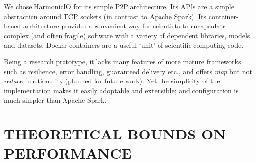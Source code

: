 \documentclass[letterpaper,conference]{IEEEtran}
\begin{document}
We chose HarmonicIO for its simple P2P architecture. Its APIs are a simple abstraction around TCP sockets (in contrast to Apache Spark). Its container-based architecture provides a convenient way for scientists to encapsulate complex (and often fragile) software with a variety of dependent libraries, models and datasets. Docker containers are a useful `unit' of scientific computing code.%

Being a research prototype, it lacks many features of more mature frameworks such as resilience, error handling, guaranteed delivery etc., and offers \emph{map} but not   \emph{reduce} functionality (planned for future work). Yet the simplicity of the implementation makes it easily adoptable and extensible; and configuration is much simpler than Apache Spark. 




\section{THEORETICAL BOUNDS ON PERFORMANCE}\label{theobounds}
\end{document}
